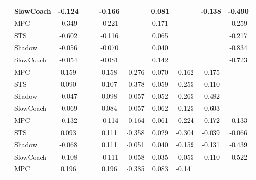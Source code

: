 \begin{tabular}{|l|l|*{9}{c|}}
                                                           & SlowCoach &   -0.124 &        &        & -0.166 &     &  0.081 &      &  -0.138 &   -0.490 \\
\midrule
[True, False, False, True, False, True, False, False, True] & MPC &   -0.349 &        &        & -0.221 &     &  0.171 &      &      &   -0.259 \\
                                                           & STS &   -0.602 &        &        & -0.116 &     &  0.065 &      &      &   -0.217 \\
                                                           & Shadow &   -0.056 &        &        & -0.070 &     &  0.040 &      &      &   -0.834 \\
                                                           & SlowCoach &   -0.054 &        &        & -0.081 &     &  0.142 &      &      &   -0.723 \\
\midrule
[True, False, False, True, True, True, True, True, False] & MPC &    0.159 &        &        &  0.158 & -0.276 &  0.070 &  -0.162 &  -0.175 &       \\
                                                           & STS &    0.090 &        &        &  0.107 & -0.378 &  0.059 &  -0.255 &  -0.110 &       \\
                                                           & Shadow &   -0.047 &        &        &  0.098 & -0.057 &  0.052 &  -0.265 &  -0.482 &       \\
                                                           & SlowCoach &   -0.069 &        &        &  0.084 & -0.057 &  0.062 &  -0.125 &  -0.603 &       \\
\midrule
[True, False, False, True, True, True, True, True, True] & MPC &   -0.132 &        &        & -0.114 & -0.164 &  0.061 &  -0.224 &  -0.172 &   -0.133 \\
                                                           & STS &    0.093 &        &        &  0.111 & -0.358 &  0.029 &  -0.304 &  -0.039 &   -0.066 \\
                                                           & Shadow &   -0.068 &        &        &  0.111 & -0.051 &  0.040 &  -0.159 &  -0.131 &   -0.439 \\
                                                           & SlowCoach &   -0.108 &        &        & -0.111 & -0.058 &  0.035 &  -0.055 &  -0.110 &   -0.522 \\
\midrule
[True, False, False, True, True, True, True, False, False] & MPC &    0.196 &        &        &  0.196 & -0.385 &  0.083 &  -0.141 &      &       \\

\end{tabular}
